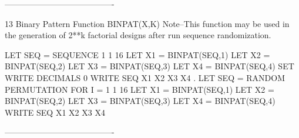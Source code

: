 ----------------------------------------
 
13
Binary Pattern Function BINPAT(X,K)
Note--This function may be used in the generation of 2**k
      factorial designs after run sequence randomization.
 
      LET SEQ = SEQUENCE 1 1 16
      LET X1 = BINPAT(SEQ,1)
      LET X2 = BINPAT(SEQ,2)
      LET X3 = BINPAT(SEQ,3)
      LET X4 = BINPAT(SEQ,4)
      SET WRITE DECIMALS 0
      WRITE SEQ X1 X2 X3 X4
      .
      LET SEQ = RANDOM PERMUTATION FOR I = 1 1 16
      LET X1 = BINPAT(SEQ,1)
      LET X2 = BINPAT(SEQ,2)
      LET X3 = BINPAT(SEQ,3)
      LET X4 = BINPAT(SEQ,4)
      WRITE SEQ X1 X2 X3 X4
 
----------------------------------------
 
 
 
 
 
 
 
 
 
 
 
 
 
 
 
 
 
 
 
 
 
 
 
 
 
 
 
 
 
 
 
 
 
 
 
 
 
 
 
 
 
 
 
 
 
 
 
 
 
 
 
 
 
 
 
 
 
 
 
 
 
 
 
 
 
 
 
 
 
 
 
 
 
 
 
 
 
 
 
 
 
 
 
 
 
 
 
 
 
 
 
 
 
 
 
 
 
 
 
 
